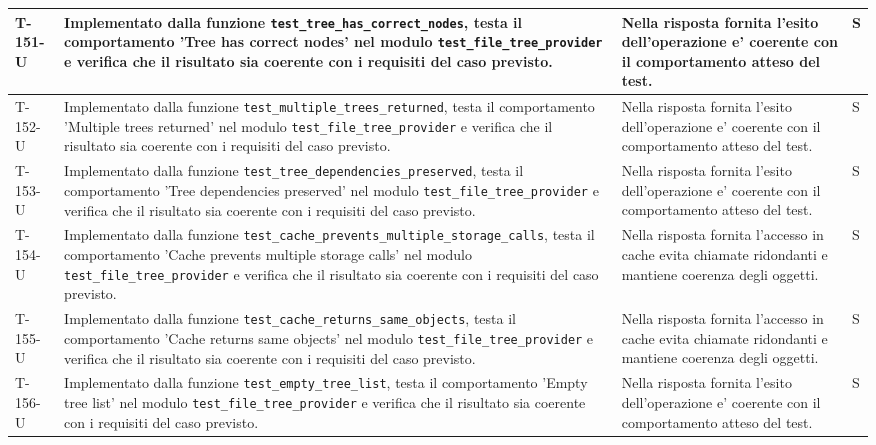 \documentclass[a4paper,12pt]{article}
\begin{document}
{{\begin{longtable}{|>{\RaggedRight\arraybackslash}p{1.55cm}|>{\RaggedRight\arraybackslash}p{8.0cm}|>{\RaggedRight\arraybackslash}p{4.6cm}|>{\RaggedRight\arraybackslash}p{1.2cm}|}
        \hline
        T-151-U & Implementato dalla funzione \texttt{test\_\allowbreak tree\_\allowbreak has\_\allowbreak correct\_\allowbreak nodes}, testa il comportamento 'Tree has correct nodes' nel modulo \texttt{test\_\allowbreak file\_\allowbreak tree\_\allowbreak provider} e verifica che il risultato sia coerente con i requisiti del caso previsto. & Nella risposta fornita l'esito dell'operazione e' coerente con il comportamento atteso del test. & S \\
        \hline
        T-152-U & Implementato dalla funzione \texttt{test\_\allowbreak multiple\_\allowbreak trees\_\allowbreak returned}, testa il comportamento 'Multiple trees returned' nel modulo \texttt{test\_\allowbreak file\_\allowbreak tree\_\allowbreak provider} e verifica che il risultato sia coerente con i requisiti del caso previsto. & Nella risposta fornita l'esito dell'operazione e' coerente con il comportamento atteso del test. & S \\
        \hline
        T-153-U & Implementato dalla funzione \texttt{test\_\allowbreak tree\_\allowbreak dependencies\_\allowbreak preserved}, testa il comportamento 'Tree dependencies preserved' nel modulo \texttt{test\_\allowbreak file\_\allowbreak tree\_\allowbreak provider} e verifica che il risultato sia coerente con i requisiti del caso previsto. & Nella risposta fornita l'esito dell'operazione e' coerente con il comportamento atteso del test. & S \\
        \hline
        T-154-U & Implementato dalla funzione \texttt{test\_\allowbreak cache\_\allowbreak prevents\_\allowbreak multiple\_\allowbreak storage\_\allowbreak calls}, testa il comportamento 'Cache prevents multiple storage calls' nel modulo \texttt{test\_\allowbreak file\_\allowbreak tree\_\allowbreak provider} e verifica che il risultato sia coerente con i requisiti del caso previsto. & Nella risposta fornita l'accesso in cache evita chiamate ridondanti e mantiene coerenza degli oggetti. & S \\
        \hline
        T-155-U & Implementato dalla funzione \texttt{test\_\allowbreak cache\_\allowbreak returns\_\allowbreak same\_\allowbreak objects}, testa il comportamento 'Cache returns same objects' nel modulo \texttt{test\_\allowbreak file\_\allowbreak tree\_\allowbreak provider} e verifica che il risultato sia coerente con i requisiti del caso previsto. & Nella risposta fornita l'accesso in cache evita chiamate ridondanti e mantiene coerenza degli oggetti. & S \\
        \hline
        T-156-U & Implementato dalla funzione \texttt{test\_\allowbreak empty\_\allowbreak tree\_\allowbreak list}, testa il comportamento 'Empty tree list' nel modulo \texttt{test\_\allowbreak file\_\allowbreak tree\_\allowbreak provider} e verifica che il risultato sia coerente con i requisiti del caso previsto. & Nella risposta fornita l'esito dell'operazione e' coerente con il comportamento atteso del test. & S \\

\end{longtable}}}
\end{document}
